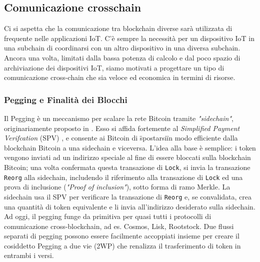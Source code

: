 \subsection{Comunicazione crosschain}
Ci si aspetta che la comunicazione tra blockchain diverse sarà utilizzata di frequente nelle applicazioni IoT. C'è sempre la necessità per un dispositivo IoT in una subchain di coordinarsi con un altro dispositivo in una diversa subchain. Ancora una volta, limitati dalla bassa potenza di calcolo e dal poco spazio di archiviazione dei dispositivi IoT, siamo motivati a progettare un tipo di comunicazione cross-chain che sia veloce ed economica in termini di risorse.

\subsubsection{Pegging e Finalità dei Blocchi}
Il Pegging è un meccanismo per scalare la rete Bitcoin tramite \emph{"sidechain"}, originariamente
proposto in \cite{c1}. Esso si affida fortemente al \emph{Simplified Payment Verifcation} (SPV) \cite{c21}, e consente ai Bitcoin di \"spostarsi\" in modo efficiente dalla blockchain Bitcoin a una sidechain
e viceversa. L'idea alla base è semplice: i token vengono inviati ad un indirizzo speciale al fine di essere bloccati sulla blockchain Bitcoin; una volta confermata questa transazione di \texttt{Lock}, si invia la transazione \texttt{Reorg} alla sidechain, includendo il riferimento alla transazione di \texttt{Lock} ed una prova di inclusione (\emph{"Proof of inclusion"}), sotto forma di ramo Merkle. La sidechain usa il SPV per verificare la transazione di \texttt{Reorg} e, se convalidata, crea una quantità di token equivalente e li invia all'indirizzo desiderato sulla sidechain. Ad oggi, il pegging funge da
primitiva per quasi tutti i protocolli di comunicazione cross-blockchain, ad es. Cosmos, Lisk,
Rootstock. Due flussi separati di pegging possono essere facilmente accoppiati insieme per creare il
cosiddetto Pegging a due vie (2WP) che renalizza il trasferimento di token in entrambi i versi.

